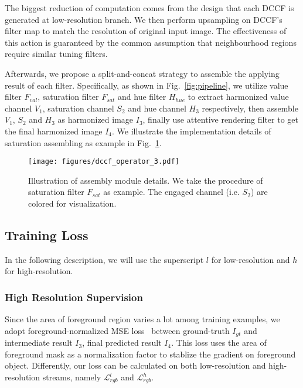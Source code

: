 \documentclass[runningheads]{llncs}
\begin{document}
    The biggest reduction of computation comes from the design that each DCCF is generated at low-resolution branch.
    We then perform upsampling on DCCF's filter map to match the resolution of original input image.
    The effectiveness of this action is guaranteed by the common assumption that neighbourhood regions require similar tuning filters. 
    
    Afterwards, we propose a split-and-concat strategy to assemble the applying result of each filter. 
    Specifically, as shown in Fig.~\ref{fig:pipeline}, we utilize value filter $F_{val}$, saturation filter $F_{sat}$ and hue filter $H_{hue}$ to extract harmonized value channel $V_1$, saturation channel $S_2$ and hue channel $H_3$ respectively, then assemble $V_1$, $S_2$ and $H_3$ as harmonized image $I_3$, finally use attentive rendering filter to get the final harmonized image $I_4$.
    We illustrate the implementation details of saturation assembling as example in Fig.~\ref{fig:pipeline_add}.
    
\begin{figure}[t]
        \centering
        \texttt{[image: figures/dccf\_operator\_3.pdf]}
        \caption{
        Illustration of assembly module details. We take the procedure of saturation filter $F_{sat}$ as example. The engaged channel (i.e. $S_2$) are colored for visualization.
        }
        \vspace{-15pt}
    \label{fig:pipeline_add}
    \end{figure}
    
    \subsection{Training Loss} \label{subsection:loss}


In the following description, we will use the superscript $l$ for low-resolution and $h$ for high-resolution.
    


    \subsubsection{High Resolution Supervision}
    
    Since the area of foreground region varies a lot among training examples, we adopt foreground-normalized MSE loss~\cite{sofiiuk2021foreground} between ground-truth $I_{gt}$ and intermediate result $I_3$, final predicted result $I_4$.
    This loss uses the area of foreground mask as a normalization factor to stablize the gradient on foreground object.
    Differently, our loss can be calculated on both low-resolution and high-resolution streams, namely $\mathcal{L}_{rgb}^l$ and $\mathcal{L}_{rgb}^h$. 
\end{document}

